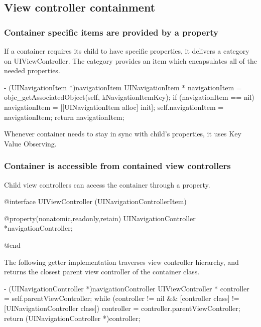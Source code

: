 \documentclass[10pt]{extarticle}
\newenvironment{codelisting}
{\footnotesize\mdframed[middlelinewidth=0.5pt, middlelinecolor=BaliHaiColor, skipabove=15pt]\verbatim}
{\endverbatim\endmdframed\vspace{12pt}\normalsize}
\begin{document}
\subsection{View controller containment}


\subsubsection{Container specific items are provided by a property}


If a container requires its child to have specific properties, it delivers a category on UIViewController. The category provides an item which encapsulates all of the needed properties.

\begin{codelisting}
- (UINavigationItem *)navigationItem
{
    UINavigationItem * navigationItem = objc_getAssociatedObject(self, kNavigationItemKey);
    if (navigationItem == nil) {
        navigationItem = [[UINavigationItem alloc] init];
        self.navigationItem = navigationItem;
    }
    return navigationItem;
}
\end{codelisting}

Whenever container needs to stay in sync with child's properties, it uses Key Value Observing.


\subsubsection{Container is accessible from contained view controllers}

Child view controllers can access the container through a property.

\begin{codelisting}
@interface UIViewController (UINavigationControllerItem)

@property(nonatomic,readonly,retain) UINavigationController *navigationController;

@end
\end{codelisting}

The following getter implementation traverses view controller hierarchy, and returns the closest parent view controller of the container class.

\begin{codelisting}
- (UINavigationController *)navigationController
{
    UIViewController * controller = self.parentViewController;
    while (controller != nil && [controller class] != [UINavigationController class]) {
        controller = controller.parentViewController;
    }
    return (UINavigationController *)controller;
}
\end{codelisting}
\end{document}
